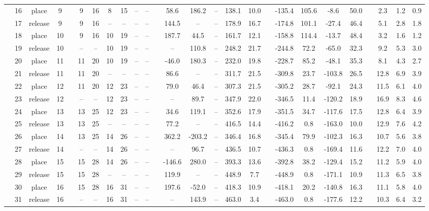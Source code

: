 \begin{landscape}
\begin{table}[h!]
\begin{threeparttable}
\begin{tabular}{c cccr ccccccr cccccr ccccr ccc}
				&16 &place &9 &&9 &16 &8 &15 &-- &-- &&58.6 &186.2 &-- &138.1 &10.0 &&-135.4 &105.6 &-8.6 &50.0 &&2.3 &1.2 &0.9 \\
				&17 &release &9 &&9 &16 &-- &-- &-- &-- &&144.5 &-- &-- &178.9 &16.7 &&-174.8 &101.1 &-27.4 &46.4 &&5.1 &2.8 &1.8 \\
				&18 &place &10 &&9 &16 &10 &19 &-- &-- &&187.7 &44.5 &-- &161.7 &12.1 &&-158.8 &114.4 &-13.7 &48.4 &&3.2 &1.6 &1.2 \\
				\rowcolor{lightgray} &19 &release &10 &&-- &-- &10 &19 &-- &-- &&-- &110.8 &-- &248.2 &21.7 &&-244.8 &72.2 &-65.0 &32.3 &&9.2 &5.3 &3.0 \\
				\rowcolor{lightgray} &20 &place &11 &&11 &20 &10 &19 &-- &-- &&-46.0 &180.3 &-- &232.0 &19.8 &&-228.7 &85.2 &-48.1 &35.3 &&8.1 &4.3 &2.7 \\
				\rowcolor{yellow} &21 &release &11 &&11 &20 &-- &-- &-- &-- &&86.6 &-- &-- &311.7 &21.5 &&-309.8 &23.7 &-103.8 &26.5 &&12.8 &6.9 &3.9 \\
				&22 &place &12 &&11 &20 &12 &23 &-- &-- &&79.0 &46.4 &-- &307.3 &21.5 &&-305.2 &28.7 &-92.1 &24.3 &&11.5 &6.1 &4.0 \\
				\rowcolor{yellow} &23 &release &12 &&-- &-- &12 &23 &-- &-- &&-- &89.7 &-- &347.9 &22.0 &&-346.5 &11.4 &-120.2 &18.9 &&16.9 &8.3 &4.6 \\
				&24 &place &13 &&13 &25 &12 &23 &-- &-- &&34.6 &119.1 &-- &352.6 &17.9 &&-351.5 &34.7 &-117.6 &17.5 &&12.8 &6.4 &3.9 \\
				\rowcolor{lightgray} &25 &release &13 &&13 &25 &-- &-- &-- &-- &&77.2 &-- &-- &416.5 &14.4 &&-416.2 &0.8 &-163.0 &10.0 &&12.9 &7.6 &4.2 \\
				\rowcolor{lightgray} &26 &place &14 &&13 &25 &14 &26 &-- &-- &&362.2 &-203.2 &-- &346.4 &16.8 &&-345.4 &79.9 &-102.3 &16.3 &&10.7 &5.6 &3.8 \\
				&27 &release &14 &&-- &-- &14 &26 &-- &-- &&-- &96.7 &-- &436.5 &10.7 &&-436.3 &0.8 &-169.4 &11.6 &&12.2 &7.0 &4.0 \\
				&28 &place &15 &&15 &28 &14 &26 &-- &-- &&-146.6 &280.0 &-- &393.3 &13.6 &&-392.8 &38.2 &-129.4 &15.2 &&11.2 &5.9 &4.0 \\
				&29 &release &15 &&15 &28 &-- &-- &-- &-- &&119.9 &-- &-- &448.9 &7.7 &&-448.9 &0.8 &-171.1 &10.9 &&11.3 &6.5 &3.8 \\
				&30 &place &16 &&15 &28 &16 &31 &-- &-- &&197.6 &-52.0 &-- &418.3 &10.9 &&-418.1 &20.2 &-140.8 &16.3 &&11.1 &5.8 &4.0 \\
				\rowcolor{lightgray} &31 &release &16 &&-- &-- &16 &31 &-- &-- &&-- &143.9 &-- &463.0 &3.4 &&-463.0 &0.8 &-177.6 &12.2 &&10.3 &6.4 &3.2 \\

\end{tabular}
\end{threeparttable}
\end{table}
\end{landscape}
